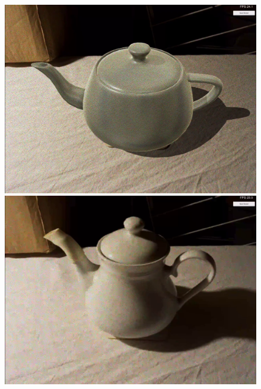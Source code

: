 \begin{figure}[H]
\begin{minipage}{0.38\textwidth}
    \end{minipage}\hfill
        \begin{minipage}{0.38\textwidth}
        \centering
        \includegraphics[width=1.5\textwidth]{Figures/TeapotVirtual.png} %
    \end{minipage}\hfill
    \begin{minipage}{0.38\textwidth}
        \centering
        \includegraphics[width=1.5\textwidth]{Figures/TeapotReal.png} %
    \end{minipage}
\end{figure}